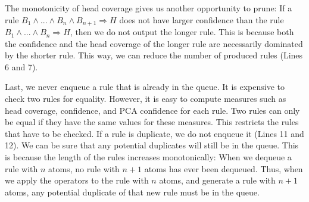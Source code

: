 The monotonicity of head coverage gives us another opportunity to prune: If a rule $B_1 \wedge ... \wedge B_n \wedge B_{n+1} \Rightarrow H$ does not have larger confidence than the rule $B_1 \wedge ... \wedge B_n \Rightarrow H$, then we do not output the longer rule. This is because both the confidence and the head coverage of the longer rule are necessarily dominated by the shorter rule. This way, we can reduce the number of produced rules (Lines 6 and 7).

Last, we never enqueue a rule that is already in the queue. It is expensive to check two rules for equality. 
However, it is easy to compute measures such as head coverage, confidence, and PCA confidence for each rule. Two rules can only be equal if they have the same values for these measures. 
This restricts the rules that have to be checked. If a rule is duplicate, we do not enqueue it (Lines 11 and 12).
We can be sure that any potential duplicates will still be in the queue. This is because the length of the rules increases monotonically: When we dequeue a rule with $n$ atoms, no rule with $n+1$ atoms has ever been dequeued. Thus, when we apply the operators to the rule with $n$ atoms, and generate a rule with $n+1$ atoms, any potential duplicate of that new rule must be in the queue.


